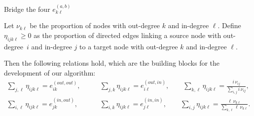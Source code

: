 \documentclass[xcolor=dvipsnames, compress, 10pt]{beamer}
\theoremstyle{remark}
\begin{document}
\begin{frame}{Bridge the four $e_{k\ell}^{(a, b)}$}

\vspace{0.2cm}

Let $\nu_{k\ell}$ be the proportion of nodes with out-degree $k$ and in-degree
$\ell$. Define $\eta_{ijk\ell} \ge 0$ as the proportion of directed edges
linking a source node with out-degree~$i$ and in-degree $j$ to a target node
with out-degree $k$ and in-degree $\ell$. 

\vspace{0.2cm}

Then the following relations hold, which are the building blocks for the
development of our algorithm:
\begin{align*}
	\sum_{j, \ell} \eta_{ijk\ell} = e^{(out, out)}_{ik}, 
	&\qquad
	\sum_{j, k} \eta_{ijk\ell} = e^{(out, in)}_{i\ell}, 
	\qquad
	\sum_{k, \ell} \eta_{ijk\ell} = \frac{i \, \nu_{ij}}{\sum_{i, j} i 
	\,\nu_{ij}},\\
	\sum_{i, \ell} \eta_{ijk\ell} = e^{(in, out)}_{jk}, 
	&\qquad 
	\sum_{i, k} \eta_{ijk\ell} = e^{(in, in)}_{j\ell}, 
	\qquad
	\sum_{i, j} \eta_{ijk\ell} = 
	\frac{\ell \, \nu_{k\ell}}{\sum_{k, \ell} \ell\, \nu_{k\ell}}.
\end{align*}
	
\end{frame}

\end{document}
